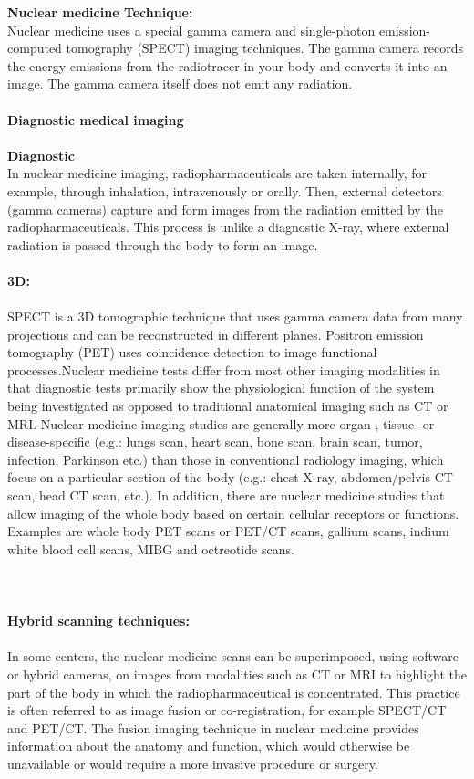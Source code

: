 \documentclass[12pt]{article}
\begin{document}
\noindent \textbf{\large Nuclear medicine Technique:} \\ Nuclear medicine uses a special gamma camera and single-photon emission-computed tomography (SPECT) imaging techniques. The gamma camera records the energy emissions from the radiotracer in your body and converts it into an image. The gamma camera itself does not emit any radiation. \\ \\
\noindent \textbf{\large Diagnostic medical imaging} \\ \\ \noindent \textbf{\large Diagnostic } \\ In nuclear medicine imaging, radiopharmaceuticals are taken internally, for example, through inhalation, intravenously or orally. Then, external detectors (gamma cameras) capture and form images from the radiation emitted by the radiopharmaceuticals. This process is unlike a diagnostic X-ray, where external radiation is passed through the body to form an image. \\ \\ \noindent \textbf{\large 3D:} \\ \\ SPECT is a 3D tomographic technique that uses gamma camera data from many projections and can be reconstructed in different planes. Positron emission tomography (PET) uses coincidence detection to image functional processes.Nuclear medicine tests differ from most other imaging modalities in that diagnostic tests primarily show the physiological function of the system being investigated as opposed to traditional anatomical imaging such as CT or MRI. Nuclear medicine imaging studies are generally more organ-, tissue- or disease-specific (e.g.: lungs scan, heart scan, bone scan, brain scan, tumor, infection, Parkinson etc.) than those in conventional radiology imaging, which focus on a particular section of the body (e.g.: chest X-ray, abdomen/pelvis CT scan, head CT scan, etc.). In addition, there are nuclear medicine studies that allow imaging of the whole body based on certain cellular receptors or functions. Examples are whole body PET scans or PET/CT scans, gallium scans, indium white blood cell scans, MIBG and octreotide scans. \\ \\

\\ \\ \noindent \textbf{\large Hybrid scanning techniques:} \\ \\ In some centers, the nuclear medicine scans can be superimposed, using software or hybrid cameras, on images from modalities such as CT or MRI to highlight the part of the body in which the radiopharmaceutical is concentrated. This practice is often referred to as image fusion or co-registration, for example SPECT/CT and PET/CT. The fusion imaging technique in nuclear medicine provides information about the anatomy and function, which would otherwise be unavailable or would require a more invasive procedure or surgery.\\ \\
\end{document}
